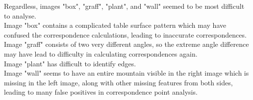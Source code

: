 \documentclass[10pt,a4paper]{article}
\begin{document}
Regardless, images "box", "graff", "plant", and "wall" seemed to be most difficult to analyse.\\
Image "box" contains a complicated table surface pattern which may have confused the correspondence calculations, leading to inaccurate correspondences.\\
Image "graff" consists of two very different angles, so the extreme angle difference may have lead to difficulty in calculating correspondences again.\\
Image "plant" has difficult to identify edges.\\
Image "wall" seems to have an entire mountain visible in the right image which is missing in the left image, along with other missing features from both sides, leading to many false positives in correspondence point analysis.
\end{document}
